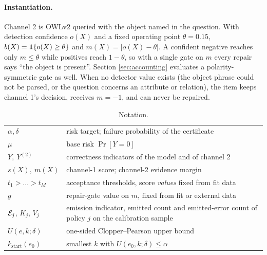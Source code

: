 \paragraph{Instantiation.}
Channel 2 is OWLv2 \citep{owlv2} queried with the object named in the question. With detection
confidence $o(X)$ and a fixed operating point $\theta=0.15$, $b(X)=\mathbf{1}\{o(X)\ge\theta\}$ and
$m(X)=|o(X)-\theta|$. A confident negative reaches only $m\le\theta$ while positives reach
$1-\theta$, so with a single gate on $m$ every repair says ``the object is present''. Section
\ref{sec:accounting} evaluates a polarity-symmetric gate as well. When no detector value exists
(the object phrase could not be parsed, or the question concerns an attribute or relation), the
item keeps channel 1's decision, receives $m=-1$, and can never be repaired.

\begin{table}[t]
\centering
\caption{Notation.}
\label{tab:notation}
\small
\begin{tabular}{@{}lp{}@{}}
\toprule
$\alpha,\delta$ & risk target; failure probability of the certificate\\
$\mu$ & base risk $\Pr[Y=0]$\\
$Y,\ Y^{(2)}$ & correctness indicators of the model and of channel 2\\
$s(X),\ m(X)$ & channel-1 score; channel-2 evidence margin\\
$t_1>\dots>t_M$ & acceptance thresholds, score \emph{values} fixed from fit data\\
$g$ & repair-gate value on $m$, fixed from fit or external data\\
$\mathcal{E}_j$, $K_j$, $V_j$ & emission indicator, emitted count and emitted-error count of policy $j$ on the calibration sample\\
$U(e,k;\delta)$ & one-sided Clopper--Pearson upper bound\\
$k_{\mathrm{start}}(e_0)$ & smallest $k$ with $U(e_0,k;\delta)\le\alpha$\\
\bottomrule
\end{tabular}
\end{table}
